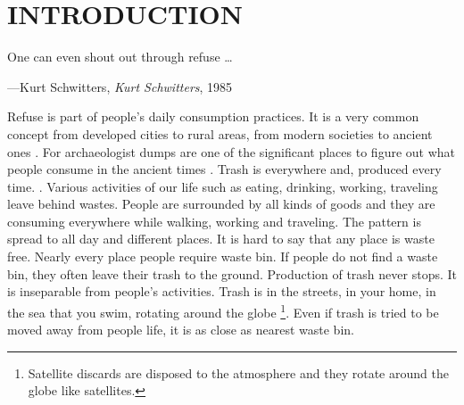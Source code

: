\chapter{INTRODUCTION}




\begin{singlespace}
\epigraph{One can even shout out through refuse \ldots}{\hfill---Kurt Schwitters, \textit{Kurt Schwitters}, 1985}
\end{singlespace}





%
%
Refuse is part of people's daily consumption practices. It is a very common concept from developed cities to rural areas, from modern societies to ancient ones \citep[33]{rathje1992rubbish}. 
For archaeologist dumps are one of the significant places to figure out what people consume in the ancient times \citep{rathje1992rubbish}.
Trash is everywhere and, produced every time.  \citep{zimring2012encyclopedia}. Various activities of our life such as eating, drinking, working, traveling leave behind wastes. People are surrounded by all kinds of goods and they are consuming everywhere while walking, working and traveling. The pattern is spread to all day and different places. It is hard to say that any place is waste free. Nearly every place people require waste bin. If people do not find a waste bin, they often leave their trash to the ground. Production of trash never stops. It is inseparable from people's activities.
Trash is in the streets, in your home, in the sea that you swim, rotating around the globe \footnote{Satellite discards are disposed to the atmosphere and they rotate around the globe like satellites.}. Even if trash is tried to be moved away from people life, it is as close as nearest waste bin.





